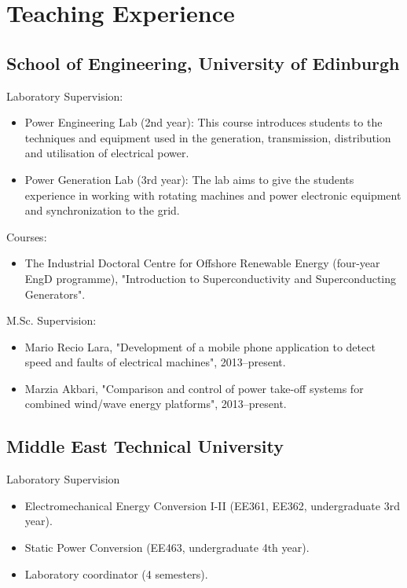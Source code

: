 \documentclass[a4paper,12pt]{article}
\begin{document}
\section{Teaching Experience}

\subsection{School of Engineering, University of Edinburgh}

Laboratory Supervision:
\begin{itemize}
\item Power Engineering Lab (2nd year): This course introduces students to the techniques and equipment used in the generation, transmission, distribution and utilisation of electrical power.
\item Power Generation Lab (3rd year): The lab aims to give the students experience in working with rotating machines and power electronic equipment and synchronization to the grid. 

\end{itemize}

Courses:
\begin{itemize}
\item The Industrial Doctoral Centre for Offshore Renewable Energy (four-year EngD programme), "Introduction to Superconductivity and Superconducting Generators".
\end{itemize}


M.Sc. Supervision:
\begin{itemize}
\item Mario Recio Lara, "Development of a mobile phone application to detect speed and faults of electrical machines", 2013--present.
\item Marzia Akbari, "Comparison and control of power take-off systems for combined wind/wave energy platforms", 2013--present.
\end{itemize}



\subsection{Middle East Technical University}
Laboratory Supervision
\begin{itemize}
\item Electromechanical Energy Conversion I-II (EE361, EE362, undergraduate 3rd year).
\item Static Power Conversion (EE463, undergraduate 4th year).
\item Laboratory coordinator (4 semesters). 
\end{itemize}
\end{document}
